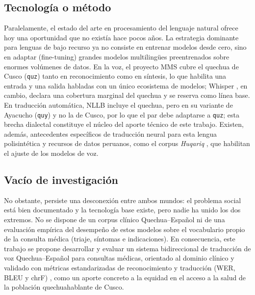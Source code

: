 \documentclass[12pt,a4paper]{article}
\begin{document}
\subsection{Tecnolog{\'i}a o m{\'e}todo}
Paralelamente, el estado del arte en procesamiento del lenguaje natural ofrece hoy una
oportunidad que no exist{\'i}a hace pocos a{\~n}os. La estrategia dominante para lenguas de bajo
recurso ya no consiste en entrenar modelos desde cero, sino en adaptar (fine-tuning) grandes
modelos multiling{\"u}es preentrenados sobre enormes vol{\'u}menes de datos. En la voz, el
proyecto MMS \parencite{pratap2024mms} cubre el quechua de Cusco (\texttt{quz}) tanto en
reconocimiento como en s{\'i}ntesis, lo que habilita una entrada y una salida habladas con un
{\'u}nico ecosistema de modelos; Whisper \parencite{radford2023whisper}, en cambio, declara una
cobertura marginal del quechua y se reserva como l{\'i}nea base. En traducci{\'o}n autom{\'a}tica,
NLLB \parencite{costajussa2022nllb} incluye el quechua, pero en su variante de Ayacucho
(\texttt{quy}) y no la de Cusco, por lo que el par debe adaptarse a \texttt{quz}; esta brecha
dialectal constituye el n{\'u}cleo del aporte t{\'e}cnico de este trabajo. Existen, adem{\'a}s,
antecedentes espec{\'i}ficos de traducci{\'o}n neural para esta lengua polisint{\'e}tica
\parencite{ortega2020quechua,mager2021americasnlp} y recursos de datos peruanos, como el corpus
\emph{Huqariq} \parencite{zevallos2022huqariq}, que habilitan el ajuste de los modelos de voz.

\subsection{Vac{\'i}o de investigaci{\'o}n}
No obstante, persiste una desconexi{\'o}n entre ambos mundos: el problema social est{\'a} bien
documentado y la tecnolog{\'i}a base existe, pero nadie ha unido los dos extremos. No se dispone
de un corpus cl{\'i}nico Quechua--Espa{\~n}ol ni de una evaluaci{\'o}n emp{\'i}rica del
desempe{\~n}o de estos modelos sobre el vocabulario propio de la consulta m{\'e}dica (triaje,
s{\'i}ntomas e indicaciones). En consecuencia, este trabajo se propone desarrollar y evaluar un
sistema bidireccional de traducci{\'o}n de voz Quechua--Espa{\~n}ol para consultas m{\'e}dicas,
orientado al dominio cl{\'i}nico y validado con m{\'e}tricas estandarizadas de reconocimiento y
traducci{\'o}n (WER, BLEU y chrF) \parencite{papineni2002bleu,popovic2015chrf}, como un aporte
concreto a la equidad en el acceso a la salud de la poblaci{\'o}n quechuahablante de Cusco.
\end{document}
